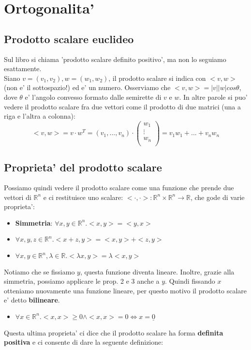 \documentclass{report}
\begin{document}
\chapter{Ortogonalita'}
\section{Prodotto scalare euclideo}
Sul libro si chiama 'prodotto scalare definito positivo', ma non lo seguiamo esattamente.\\
Siano $ v=(v_1,v_2), w=(w_1,w_2) $, il prodotto scalare si indica con $ <v,w> $ (non e' il sottospazio!) ed e' un numero. Osserviamo che $ <v,w> = |v||w|cos\theta $, dove $ \theta $ e' l'angolo convesso formato dalle semirette di $ v $ e $ w $.
In altre parole si puo' vedere il prodotto scalare fra due vettori come il prodotto di due matrici (una a riga e l'altra a colonna):
\[
  <v,w> = v\cdot w^T = (v_1,...,v_n)\cdot \begin{pmatrix}
  w_1\\
  \vdots\\
  w_n\\
  \end{pmatrix} = v_1w_1+...+v_nw_n
\]
\section{Proprieta' del prodotto scalare}
Possiamo quindi vedere il prodotto scalare come una funzione che prende due vettori di $ \mathbb{R}^n $ e ci restituisce uno scalare: $ <\cdot,\cdot>: \mathbb{R}^n \times \mathbb{R}^n \to \mathbb{R} $, che gode di varie proprieta':
\begin{itemize}
\item \textbf{Simmetria}: $ \forall x,y \in \mathbb{R}^n. <x,y> = <y,x> $
\item $ \forall x,y,z \in \mathbb{R}^n. <x+z, y> = <x,y>+<z,y> $
\item $ \forall x,y \in \mathbb{R}^n, \lambda \in \mathbb{R}. <\lambda x, y> = \lambda <x,y> $
\end{itemize}
Notiamo che se fissiamo $ y $, questa funzione diventa lineare. Inoltre, grazie alla simmetria, possiamo applicare le prop. 2 e 3 anche a $ y $. Quindi fissando $ x $ otteniamo nuovamente una funzione lineare, per questo motivo il prodotto scalare e' detto \textbf{bilineare}.
\begin{itemize}
\item $ \forall x \in \mathbb{R}^n. <x,x> \geq 0 \land <x,x> = 0 \iff x = \underline{0} $
\end{itemize}
Questa ultima proprieta' ci dice che il prodotto scalare ha forma \textbf{definita positiva} e ci consente di dare la seguente definizione:
\end{document}

